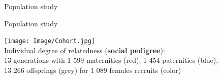 \documentclass[compress]{beamer}
\begin{document}
\begin{frame}{Population study}
\vspace{5cm}
\centering
\end{frame}


\begin{frame}{Population study}

\centering
  \texttt{[image: Image/Cohort.jpg]} \\
\vspace{0.1cm}
\small Individual degree of relatedness (\textbf{social pedigree}):\\
13 generations with 1 599 maternities (red), 1 454 paternities (blue),\\ 13 266 offsprings (grey) for 1 089 females recruits (color)


\end{frame}


\end{document}
